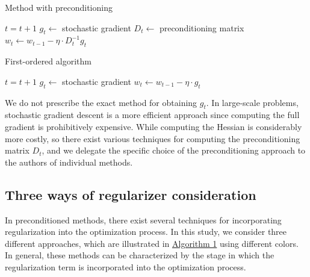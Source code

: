 \documentclass{article}
\begin{document}
\begin{minipage}{0.47\textwidth}
    \begin{algorithm}[H]
        \caption{Method with preconditioning}
        \label{alg:precondgen}
        
        \begin{algorithmic}
                
                \State $t = t+1$
                \State $g_t \gets$ stochastic gradient
                \State $D_t \gets$ preconditioning matrix
                \State $w_t \gets w_{t-1} - \eta \cdot D_t^{-1} g_t$
                \EndWhile
        \end{algorithmic}
    \end{algorithm}
\end{minipage}
\hfill
\begin{minipage}{0.47\textwidth}
    \begin{algorithm}[H]
        \caption{First-ordered algorithm}
        \label{alg:first}
        \begin{algorithmic}
                
                \State $t = t+1$
                \State $g_t \gets$ stochastic gradient
                \State $w_t \gets w_{t-1} - \eta \cdot g_t$
                \EndWhile
        \end{algorithmic}
    \end{algorithm}
\end{minipage}

We do not prescribe the exact method for obtaining $g_t$. In large-scale problems, stochastic gradient descent is a more efficient approach since computing the full gradient is prohibitively expensive. While computing the Hessian is considerably more costly, so there exist various techniques for computing the preconditioning matrix $D_t$, and we delegate the specific choice of the preconditioning approach to the authors of individual methods.

\subsection{Three ways of regularizer consideration}

\fi

In preconditioned methods, there exist several techniques for incorporating regularization into the optimization process.
In this study, we consider three different approaches, which are illustrated in \hyperref[alg:precond]{Algorithm 1} using different colors.
In general, these methods can be characterized by the stage in which the regularization term is incorporated into the optimization process.
\end{document}
